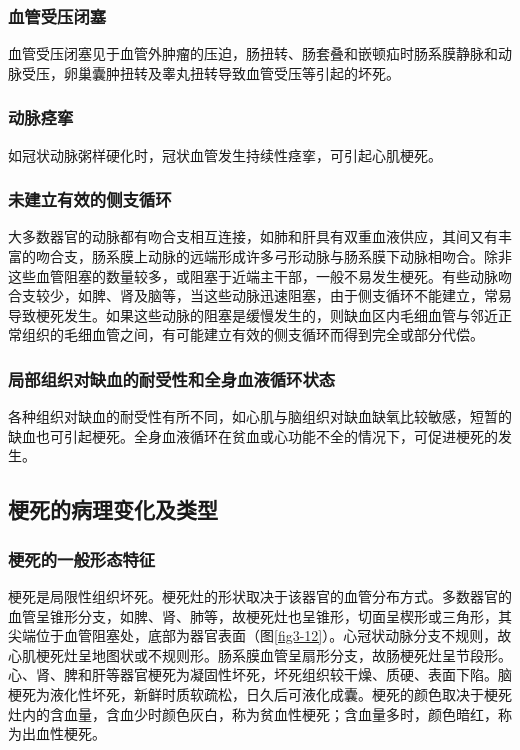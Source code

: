 \subsubsection{血管受压闭塞}

血管受压闭塞见于血管外肿瘤的压迫，肠扭转、肠套叠和嵌顿疝时肠系膜静脉和动脉受压，卵巢囊肿扭转及睾丸扭转导致血管受压等引起的坏死。

\subsubsection{动脉痉挛}

如冠状动脉粥样硬化时，冠状血管发生持续性痉挛，可引起心肌梗死。

\subsubsection{未建立有效的侧支循环}

大多数器官的动脉都有吻合支相互连接，如肺和肝具有双重血液供应，其间又有丰富的吻合支，肠系膜上动脉的远端形成许多弓形动脉与肠系膜下动脉相吻合。除非这些血管阻塞的数量较多，或阻塞于近端主干部，一般不易发生梗死。有些动脉吻合支较少，如脾、肾及脑等，当这些动脉迅速阻塞，由于侧支循环不能建立，常易导致梗死发生。如果这些动脉的阻塞是缓慢发生的，则缺血区内毛细血管与邻近正常组织的毛细血管之间，有可能建立有效的侧支循环而得到完全或部分代偿。

\subsubsection{局部组织对缺血的耐受性和全身血液循环状态}

各种组织对缺血的耐受性有所不同，如心肌与脑组织对缺血缺氧比较敏感，短暂的缺血也可引起梗死。全身血液循环在贫血或心功能不全的情况下，可促进梗死的发生。

\subsection{梗死的病理变化及类型}

\subsubsection{梗死的一般形态特征}

梗死是局限性组织坏死。梗死灶的形状取决于该器官的血管分布方式。多数器官的血管呈锥形分支，如脾、肾、肺等，故梗死灶也呈锥形，切面呈楔形或三角形，其尖端位于血管阻塞处，底部为器官表面（图\ref{fig3-12}）。心冠状动脉分支不规则，故心肌梗死灶呈地图状或不规则形。肠系膜血管呈扇形分支，故肠梗死灶呈节段形。心、肾、脾和肝等器官梗死为凝固性坏死，坏死组织较干燥、质硬、表面下陷。脑梗死为液化性坏死，新鲜时质软疏松，日久后可液化成囊。梗死的颜色取决于梗死灶内的含血量，含血少时颜色灰白，称为贫血性梗死；含血量多时，颜色暗红，称为出血性梗死。

